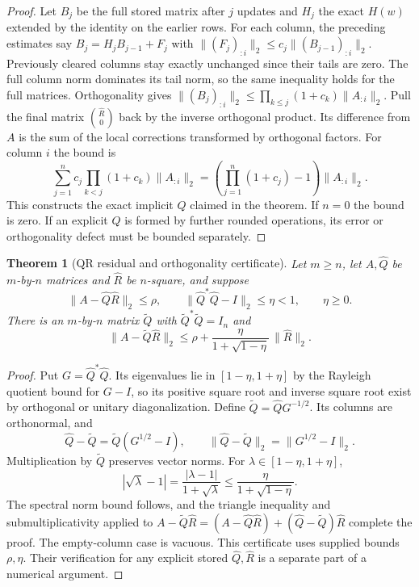 \documentclass[11pt,oneside,openany]{book}
\theoremstyle{plain}
\newtheorem{theorem}{Theorem}[chapter]
\theoremstyle{definition}
\theoremstyle{remark}
\begin{document}
\begin{proof}
Let \(B_j\) be the full stored matrix after \(j\) updates and
\(H_j\) the exact \(H(w)\) extended by the identity on the
earlier rows. For each column, the preceding estimates say
\(B_j=H_jB_{j-1}+F_j\) with
\(\|(F_j)_{:i}\|_2\le c_j\|(B_{j-1})_{:i}\|_2\).
Previously cleared columns stay exactly unchanged since their
tails are zero. The full column norm dominates its tail norm,
so the same inequality holds for the full matrices.
Orthogonality gives
\(\|(B_j)_{:i}\|_2\le\prod_{k\le j}(1+c_k)\|A_{:i}\|_2\).
Pull the final matrix \(\binom{\hat R}{0}\) back by the
inverse orthogonal product. Its difference from \(A\) is the
sum of the local corrections transformed by orthogonal factors.
For column \(i\) the bound is
\[
   \sum_{j=1}^n c_j\prod_{k<j}(1+c_k)\|A_{:i}\|_2
        =\left(\prod_{j=1}^n(1+c_j)-1\right)\|A_{:i}\|_2 .
\]
This constructs the exact implicit \(Q\) claimed in the theorem.
If \(n=0\) the bound is zero. If an explicit \(Q\) is formed
by further rounded operations, its error or orthogonality
defect must be bounded separately.
\end{proof}

\begin{theorem}[QR residual and orthogonality certificate]
\label{p206:W33}
Let \(m\ge n\), let \(A,\hat Q\) be \(m\)-by-\(n\) matrices
and \(\hat R\) be \(n\)-square, and suppose
\[
       \|A-\hat Q\hat R\|_2\le\rho,\qquad
       \|\hat Q^*\hat Q-I\|_2\le\eta<1,\qquad \eta\ge0.
\]
There is an \(m\)-by-\(n\) matrix \(\widetilde Q\) with
\(\widetilde Q^*\widetilde Q=I_n\) and
\[
 \|A-\widetilde Q\hat R\|_2
     \le \rho+\frac{\eta}{1+\sqrt{1-\eta}}\,\|\hat R\|_2 .
\]
\end{theorem}

\begin{proof}
Put \(G=\hat Q^*\hat Q\). Its eigenvalues lie in
\([1-\eta,1+\eta]\) by the Rayleigh quotient bound for \(G-I\),
so its positive square root and inverse square root exist by
orthogonal or unitary diagonalization. Define
\(\widetilde Q=\hat QG^{-1/2}\). Its columns are orthonormal, and
\[
 \hat Q-\widetilde Q=\widetilde Q(G^{1/2}-I),\qquad
 \|\hat Q-\widetilde Q\|_2=\|G^{1/2}-I\|_2.
\]
Multiplication by \(\widetilde Q\) preserves vector norms.
For \(\lambda\in[1-\eta,1+\eta]\),
\[
       |\sqrt{\lambda}-1|
       =\frac{|\lambda-1|}{1+\sqrt{\lambda}}
       \le\frac{\eta}{1+\sqrt{1-\eta}} .
\]
The spectral norm bound follows, and the triangle inequality
and submultiplicativity applied to
\(A-\widetilde Q\hat R=(A-\hat Q\hat R)+(\hat Q-\widetilde Q)\hat R\)
complete the proof. The empty-column case is vacuous.
This certificate uses supplied bounds \(\rho,\eta\). Their
verification for any explicit stored \(\hat Q,\hat R\) is a
separate part of a numerical argument.
\end{proof}
\end{document}
